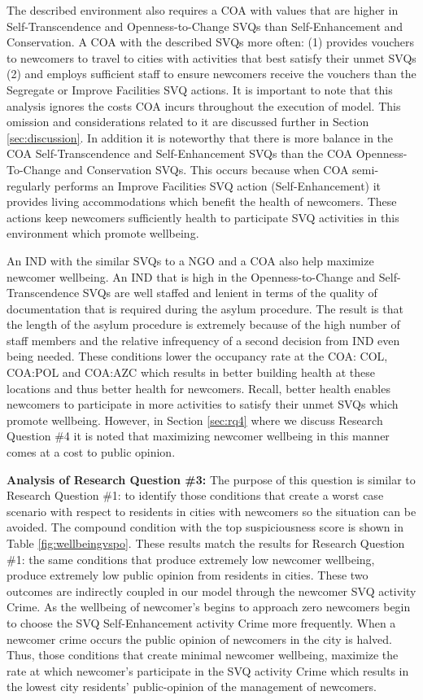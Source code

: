 \documentclass{scspaperproc}
\theoremstyle{scsthe}
\begin{document}
The described environment also requires a COA with values that are higher in Self-Transcendence and Openness-to-Change SVQs than Self-Enhancement and Conservation. A COA with the described SVQs more often: (1) provides vouchers to newcomers to travel to cities with activities that best satisfy their unmet SVQs (2) and employs sufficient staff to ensure newcomers receive the vouchers than the Segregate or Improve Facilities SVQ actions. It is important to note that this analysis ignores the costs COA incurs throughout the execution of model. This omission and considerations related to it are discussed further in Section \ref{sec:discussion}. In addition it is noteworthy that there is more balance in the COA Self-Transcendence and Self-Enhancement SVQs than the COA Openness-To-Change and Conservation SVQs. This occurs because when COA semi-regularly performs an Improve Facilities SVQ action (Self-Enhancement) it provides living accommodations which benefit the health of newcomers. These actions keep newcomers sufficiently health to participate SVQ activities in this environment which promote wellbeing.  

An IND with the similar SVQs to a NGO and a COA also help maximize newcomer wellbeing. An IND that is high in the Openness-to-Change and Self-Transcendence SVQs are well staffed and lenient in terms of the quality of documentation that is required during the asylum procedure. The result is that the length of the asylum procedure is extremely because of the high number of staff members and the relative infrequency of a second decision from IND even being needed. These conditions lower the occupancy rate at the COA: COL, COA:POL and COA:AZC which results in better building health at these locations and thus better health for newcomers. Recall, better health enables newcomers to participate in more activities to satisfy their unmet SVQs which promote wellbeing. However, in Section \ref{sec:rq4} where we discuss Research Question \#4 it is noted that maximizing newcomer wellbeing in this manner comes at a cost to public opinion. 

{\bf Analysis of Research Question \#3:} The purpose of this question is similar to Research Question \#1: to identify those conditions that create a worst case scenario with respect to residents in cities with newcomers so the situation can be avoided. The compound condition with the top suspiciousness score is shown in Table \ref{fig:wellbeingvspo}. These results match the results for Research Question \#1: the same conditions that produce extremely low newcomer wellbeing, produce extremely low public opinion from residents in cities. These two outcomes are indirectly coupled in our model through the newcomer SVQ activity Crime. As the wellbeing of newcomer's begins to approach zero newcomers begin to choose the SVQ Self-Enhancement activity Crime more frequently.  When a newcomer crime occurs the public opinion of newcomers in the city is halved. Thus, those conditions that create minimal newcomer wellbeing, maximize the rate at which newcomer's participate in the SVQ activity Crime which results in the lowest city residents' public-opinion of the management of newcomers. 
\end{document}
